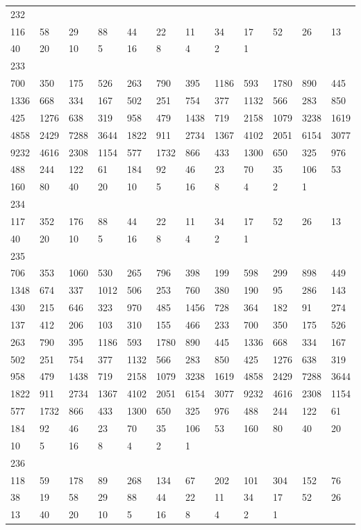 \begin{longtable}{llllllllllll}
232&&&&&&&&&&&\\
116& 58& 29& 88& 44& 22& 11& 34& 17& 52& 26& 13\\
40& 20& 10& 5& 16& 8& 4& 2& 1& \\

233&&&&&&&&&&&\\
700& 350& 175& 526& 263& 790& 395& 1186& 593& 1780& 890& 445\\
1336& 668& 334& 167& 502& 251& 754& 377& 1132& 566& 283& 850\\
425& 1276& 638& 319& 958& 479& 1438& 719& 2158& 1079& 3238& 1619\\
4858& 2429& 7288& 3644& 1822& 911& 2734& 1367& 4102& 2051& 6154& 3077\\
9232& 4616& 2308& 1154& 577& 1732& 866& 433& 1300& 650& 325& 976\\
488& 244& 122& 61& 184& 92& 46& 23& 70& 35& 106& 53\\
160& 80& 40& 20& 10& 5& 16& 8& 4& 2& 1& \\

234&&&&&&&&&&&\\
117& 352& 176& 88& 44& 22& 11& 34& 17& 52& 26& 13\\
40& 20& 10& 5& 16& 8& 4& 2& 1& \\

235&&&&&&&&&&&\\
706& 353& 1060& 530& 265& 796& 398& 199& 598& 299& 898& 449\\
1348& 674& 337& 1012& 506& 253& 760& 380& 190& 95& 286& 143\\
430& 215& 646& 323& 970& 485& 1456& 728& 364& 182& 91& 274\\
137& 412& 206& 103& 310& 155& 466& 233& 700& 350& 175& 526\\
263& 790& 395& 1186& 593& 1780& 890& 445& 1336& 668& 334& 167\\
502& 251& 754& 377& 1132& 566& 283& 850& 425& 1276& 638& 319\\
958& 479& 1438& 719& 2158& 1079& 3238& 1619& 4858& 2429& 7288& 3644\\
1822& 911& 2734& 1367& 4102& 2051& 6154& 3077& 9232& 4616& 2308& 1154\\
577& 1732& 866& 433& 1300& 650& 325& 976& 488& 244& 122& 61\\
184& 92& 46& 23& 70& 35& 106& 53& 160& 80& 40& 20\\
10& 5& 16& 8& 4& 2& 1& \\

236&&&&&&&&&&&\\
118& 59& 178& 89& 268& 134& 67& 202& 101& 304& 152& 76\\
38& 19& 58& 29& 88& 44& 22& 11& 34& 17& 52& 26\\
13& 40& 20& 10& 5& 16& 8& 4& 2& 1& \\


\end{longtable}
